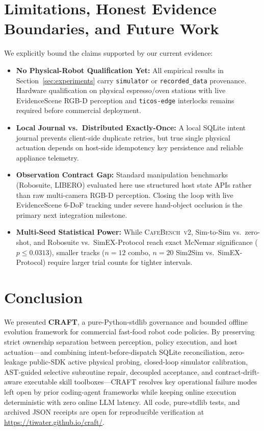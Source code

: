 \documentclass[10pt,journal]{IEEEtran}
\begin{document}
\section{Limitations, Honest Evidence Boundaries, and Future Work}
\label{sec:limitations}

We explicitly bound the claims supported by our current evidence:
\begin{itemize}
    \item \textbf{No Physical-Robot Qualification Yet:} All empirical results in Section~\ref{sec:experiments} carry \texttt{simulator} or \texttt{recorded\_data} provenance. Hardware qualification on physical espresso/oven stations with live EvidenceScene RGB-D perception and \texttt{ticos-edge} interlocks remains required before commercial deployment.
    \item \textbf{Local Journal vs.\ Distributed Exactly-Once:} A local SQLite intent journal prevents client-side duplicate retries, but true single physical actuation depends on host-side idempotency key persistence and reliable appliance telemetry.
    \item \textbf{Observation Contract Gap:} Standard manipulation benchmarks (Robosuite, LIBERO) evaluated here use structured host state APIs rather than raw multi-camera RGB-D perception. Closing the loop with live EvidenceScene 6-DoF tracking under severe hand-object occlusion is the primary next integration milestone.
    \item \textbf{Multi-Seed Statistical Power:} While \textsc{CafeBench~v2}, Sim-to-Sim vs.\ zero-shot, and Robosuite vs.\ SimEX-Protocol reach exact McNemar significance ($p \le 0.0313$), smaller tracks ($n{=}12$ combo, $n{=}20$ Sim2Sim vs.\ SimEX-Protocol) require larger trial counts for tighter intervals.
\end{itemize}

\section{Conclusion}
\label{sec:conclusion}

We presented \textbf{CRAFT}, a pure-Python-stdlib governance and bounded offline evolution framework for commercial fast-food robot code policies. By preserving strict ownership separation between perception, policy execution, and host actuation---and combining intent-before-dispatch SQLite reconciliation, zero-leakage public-SDK active physical probing, closed-loop simulator calibration, AST-guided selective subroutine repair, decoupled acceptance, and contract-drift-aware executable skill toolboxes---CRAFT resolves key operational failure modes left open by prior coding-agent frameworks while keeping online execution deterministic with zero online LLM latency. All code, pure-stdlib tests, and archived JSON receipts are open for reproducible verification at \url{https://tiwater.github.io/craft/}.



\end{document}
